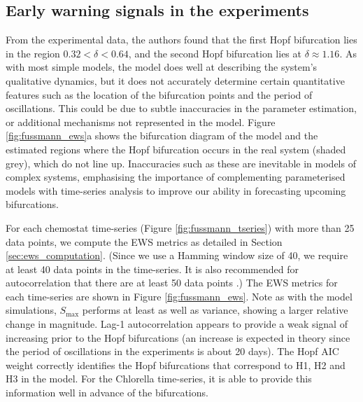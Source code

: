 \documentclass[10pt]{article}
\begin{document}
\subsection{Early warning signals in the experiments}

From the experimental data, the authors found that the first Hopf bifurcation lies in the region $0.32<\delta<0.64$, and the second Hopf bifurcation lies at $\delta\approx 1.16$. As with most simple models, the model does well at describing the system's qualitative dynamics, but it does not accurately determine certain quantitative features such as the location of the bifurcation points and the period of oscillations. This could be due to subtle inaccuracies in the parameter estimation, or additional mechanisms not represented in the model. Figure \ref{fig:fussmann_ews}a shows the bifurcation diagram of the model and the estimated regions where the Hopf bifurcation occurs in the real system (shaded grey), which do not line up. Inaccuracies such as these are inevitable in models of complex systems, emphasising the importance of complementing parameterised models with time-series analysis to improve our ability in forecasting upcoming bifurcations.

For each chemostat time-series (Figure \ref{fig:fussmann_tseries}) with more than 25 data points, we compute the EWS metrics as detailed in Section \ref{sec:ews_computation}. (Since we use a Hamming window size of 40, we require at least 40 data points in the time-series. It is also recommended for autocorrelation that there are at least 50 data points \cite{box15}.) The EWS metrics for each time-series are shown in Figure \ref{fig:fussmann_ews}. Note as with the model simulations, $S_{\text{max}}$ performs at least as well as variance, showing a larger relative change in magnitude. Lag-1 autocorrelation appears to provide a weak signal of increasing prior to the Hopf bifurcations (an increase is expected in theory since the period of oscillations in the experiments is about 20 days). The Hopf AIC weight correctly identifies the Hopf bifurcations that correspond to H1, H2 and H3 in the model. For the Chlorella time-series, it is able to provide this information well in advance of the bifurcations.
\end{document}
